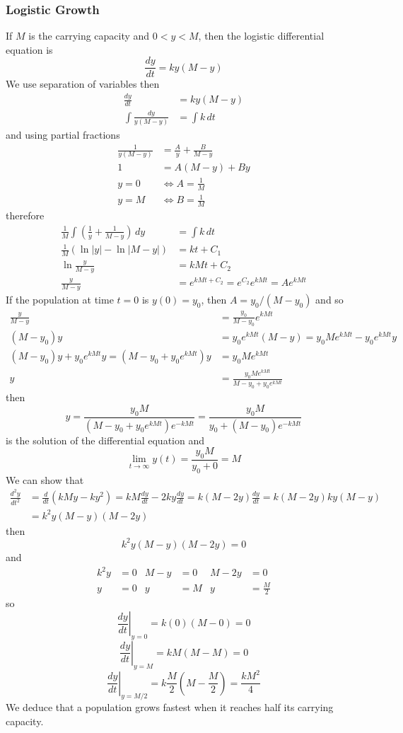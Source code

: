 \subsubsection*{Logistic Growth}
If \(M\) is the carrying capacity and \(0<y<M\), then the logistic
differential equation is
\[\frac{dy}{dt}=ky(M-y)\]
We use separation of variables then
\begin{align*}
    \frac{dy}{dt} &= ky(M-y) \\
    \int\frac{dy}{y(M-y)} &= \int k\,dt
\end{align*}
and using partial fractions
\begin{align*}
    \frac{1}{y(M-y)} &= \frac{A}{y}+\frac{B}{M-y} \\
    1 &= A(M-y)+By \\
    y=0 &\iff A=\frac{1}{M} \\
    y=M &\iff B=\frac{1}{M}
\end{align*}
therefore
\begin{align*}
    \frac{1}{M}\int\left(\frac{1}{y}+\frac{1}{M-y}\right)\,dy &= \int k\,dt \\
    \frac{1}{M}(\ln|y|-\ln|M-y|) &= kt+C_1 \\
    \ln\frac{y}{M-y} &= kMt+C_2 \\
    \frac{y}{M-y} &= e^{kMt+C_2}=e^{C_2}e^{kMt}=Ae^{kMt}
\end{align*}
If the population at time \(t=0\) is \(y(0)=y_0\),
then \(A=y_0/(M-y_0)\) and so
\begin{align*}
    \frac{y}{M-y} &= \frac{y_0}{M-y_0}e^{kMt} \\
    (M-y_0)y &= y_0e^{kMt}(M-y)=y_0Me^{kMt}-y_0e^{kMt}y \\
    (M-y_0)y+y_0e^{kMt}y=(M-y_0+y_0e^{kMt})y &= y_0Me^{kMt} \\
    y &= \frac{y_0Me^{kMt}}{M-y_0+y_0e^{kMt}}
\end{align*}
then
\[y=\frac{y_0M}{(M-y_0+y_0e^{kMt})e^{-kMt}}=\frac{y_0M}{y_0+(M-y_0)e^{-kMt}}\]
is the solution of the differential equation and
\[\lim_{t\to\infty}y(t)=\frac{y_0M}{y_0+0}=M\]
We can show that
\begin{align*}
    \frac{d^2y}{dt^2} &= \frac{d}{dt}(kMy-ky^2)=kM\frac{dy}{dt}-2ky\frac{dy}{dt}
    =k(M-2y)\frac{dy}{dt}=k(M-2y)ky(M-y) \\
    &= k^2y(M-y)(M-2y)
\end{align*}
then
\[k^2y(M-y)(M-2y)=0\]
and
\begin{align*}
    k^2y &= 0 & M-y &= 0 & M-2y &= 0 \\
    y &= 0 & y &= M & y &= \frac{M}{2}
\end{align*}
so
\[\left.\frac{dy}{dt}\right|_{y=0}=k(0)(M-0)=0\]
\[\left.\frac{dy}{dt}\right|_{y=M}=kM(M-M)=0\]
\[\left.\frac{dy}{dt}\right|_{y=M/2}=k\frac{M}{2}\left(M-\frac{M}{2}\right)
=\frac{kM^2}{4}\]
We deduce that a population grows fastest when it reaches half its carrying
capacity.

